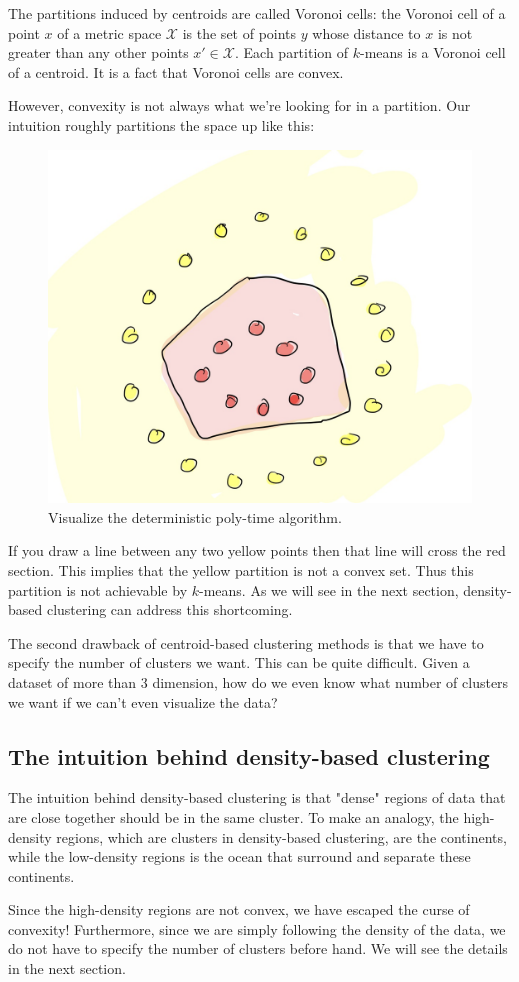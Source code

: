 The partitions induced by centroids are called Voronoi cells: the Voronoi
cell of a point $x$ of a metric space $\mathcal{X}$ is the set of points
$y$ whose distance to $x$ is not greater than any other points $x' \in \mathcal{X}$.
Each partition of $k$-means is a Voronoi cell of a centroid. It is a fact that
Voronoi cells are convex.

However, convexity is not always what we're looking for in a partition. Our intuition
roughly partitions the space up like this:

\begin{figure}[h]
\centering
\includegraphics[width=.7\linewidth]{chapter_2/files/intuition-cell.jpg}
\caption{Visualize the deterministic poly-time algorithm. }
\end{figure}

If you draw a line between any two yellow points then that line will
cross the red section. This implies that the yellow partition is not a convex
set. Thus this partition is not achievable by $k$-means. As we will see
in the next section, density-based clustering can address this shortcoming.

The second drawback of centroid-based clustering methods is that we have
to specify the number of clusters we want. This can be quite difficult. Given
a dataset of more than 3 dimension, how do we even know what number of clusters
we want if we can't even visualize the data?

\subsection{The intuition behind density-based clustering}

The intuition behind density-based clustering is that "dense" regions of data
that are close together should be in the same cluster. To make an analogy,
the high-density regions, which are clusters in density-based clustering, are the continents,
while the low-density regions is the ocean that surround and separate these
continents.

Since the high-density regions are not convex, we have escaped the curse of
convexity! Furthermore, since we are simply following the density of the data,
we do not have to specify the number of clusters before hand. We will see the
details in the next section.
